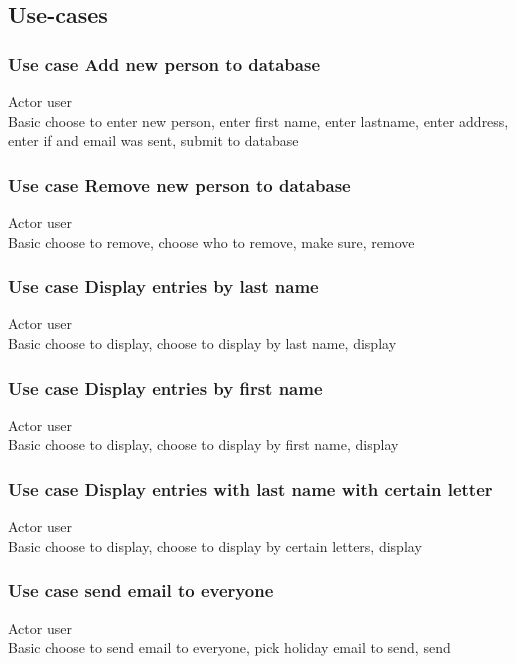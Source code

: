 \documentclass{article}
\begin{document}
\subsection{Use-cases}
\subsubsection*{Use case Add new person to database}
Actor user \\
Basic choose to enter new person, enter first name, enter lastname, enter address, enter if and email was sent, submit to database \\

\subsubsection*{Use case Remove new person to database}
Actor user \\
Basic choose to remove, choose who to remove, make sure, remove\\
 
\subsubsection*{Use case Display entries by last name}
Actor user \\
Basic choose to display, choose to display by last name, display \\
 
\subsubsection*{Use case Display entries by first name}
Actor user \\
Basic choose to display, choose to display by first name, display \\
 
\subsubsection*{Use case Display entries with last name with certain letter}
Actor user \\
Basic choose to display, choose to display by certain letters, display \\
 
\subsubsection*{Use case send email to everyone}
Actor user \\
Basic choose to send email to everyone, pick holiday email to send, send \\
 
\end{document}
